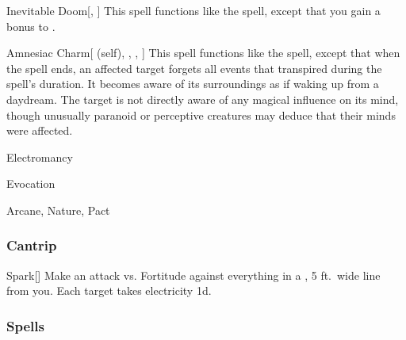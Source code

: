 \lowercase{\hypertarget{spell:Inevitable Doom}{}}\label{spell:Inevitable Doom}
\begin{apability}[\nth{4}]{\hypertarget{spell:Inevitable Doom}{Inevitable Doom}}[, ]
This spell functions like the  spell, except that you gain a  bonus to .
\end{apability}
\vspace{0.25em}



\lowercase{\hypertarget{spell:Amnesiac Charm}{}}\label{spell:Amnesiac Charm}
\begin{attuneability}[\nth{5}]{\hypertarget{spell:Amnesiac Charm}{Amnesiac Charm}}[ (self), , , ]
This spell functions like the  spell, except that when the spell ends, an affected target forgets all events that transpired during the spell's duration.
It becomes aware of its surroundings as if waking up from a daydream.
The target is not directly aware of any magical influence on its mind, though unusually paranoid or perceptive creatures may deduce that their minds were affected.
\end{attuneability}
\vspace{0.25em}


\newpage
\begin{spellsection}{Electromancy}

\begin{spellheader}
\end{spellheader}


 Evocation

 Arcane, Nature, Pact

\subsubsection{Cantrip}


\begin{freeability}{Spark}[]
Make an attack vs. Fortitude against everything in a \areamed, 5 ft.\ wide line from you.
\hit Each target takes electricity  \minus1d.
\end{freeability}

\end{spellsection}


\subsubsection{Spells}


